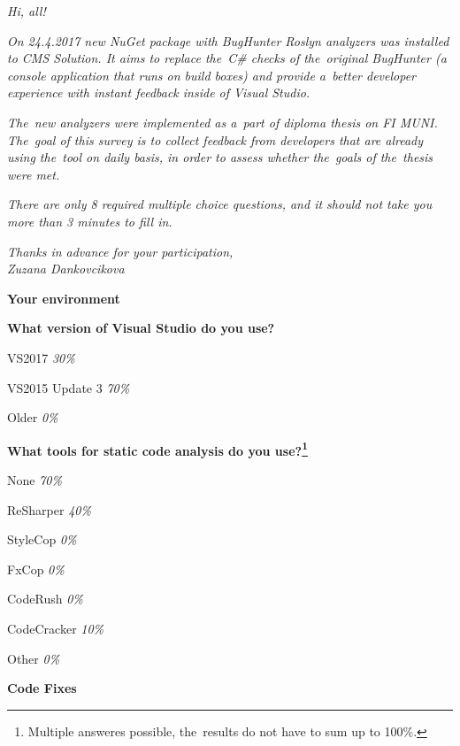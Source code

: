 \documentclass[
  digital, %
  table,   %
  lof,     %
  lot,     %
  oneside,
]{fithesis3}
\begin{document}
\bigskip\noindent
\textit{Hi, all!}

\bigskip\noindent
\textit{On 24.4.2017 new NuGet package with BugHunter Roslyn analyzers was installed to CMS Solution. It aims to replace the~C\# checks of the~original BugHunter (a console application that runs on build boxes) and provide a~better developer experience with instant feedback inside of Visual Studio.}

\textit{The~new analyzers were implemented as a~part of diploma thesis on FI MUNI. The~goal of this survey is to collect feedback from developers that are already using the~tool on daily basis, in order to assess whether the~goals of the~thesis were met.}

\textit{There are only 8 required multiple choice questions, and it should not take you more than 3 minutes to fill in.}

\bigskip\noindent
\textit{Thanks in advance for your participation,}
\\ \noindent
\textit{Zuzana Dankovcikova}

\begin{center}
\textbf{Your environment}
\end{center}

\smallskip\noindent
\textbf{What version of Visual Studio do you use?}
\begin{compactitem}
\item VS2017 \textit{30\%}
\item VS2015 Update 3 \textit{70\%}
\item Older \textit{0\%}
\end{compactitem}

\smallskip\noindent
\textbf{What tools for static code analysis do you use?\footnote{Multiple answeres possible, the~results do not have to sum up to 100\%.}}
\begin{compactitem}
\item None \textit{70\%}
\item ReSharper \textit{40\%}
\item StyleCop \textit{0\%}
\item FxCop \textit{0\%}
\item CodeRush \textit{0\%}
\item CodeCracker \textit{10\%}
\item Other \textit{0\%}
\end{compactitem}

\begin{center}
\textbf{Code Fixes}
\end{center}
\end{document}
